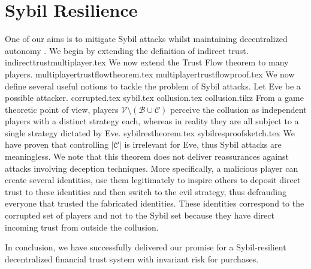 \section{Sybil Resilience}
  One of our aims is to mitigate Sybil attacks \cite{sybilattack} whilst maintaining decentralized autonomy \cite{dionyziz}.
  We begin by extending the definition of indirect trust.
  {indirecttrustmultiplayer.tex}
  \noindent We now extend the Trust Flow theorem to many players.
  {multiplayertrustflowtheorem.tex}
  {multiplayertrustflowproof.tex}
  \noindent We now define several useful notions to tackle the problem of Sybil attacks. Let Eve be a possible attacker.
  {corrupted.tex}
  {sybil.tex}
  {collusion.tex}
  {collusion.tikz}
  From a game theoretic point of view, players $\mathcal{V} \setminus (\mathcal{B} \cup \mathcal{C})$ perceive the collusion
  as independent players with a distinct strategy each, whereas in reality they are all subject to a single strategy dictated
  by Eve.
  {sybilrestheorem.tex}
  {sybilresproofsketch.tex}
  We have proven that controlling $|\mathcal{C}|$ is irrelevant for Eve, thus Sybil attacks are meaningless. We note that
  this theorem does not deliver reassurances against attacks involving deception techniques. More specifically, a malicious
  player can create several identities, use them legitimately to inspire others to deposit direct trust to these identities
  and then switch to the evil strategy, thus defrauding everyone that trusted the fabricated identities. These identities
  correspond to the corrupted set of players and not to the Sybil set because they have direct incoming trust from outside
  the collusion.

  In conclusion, we have successfully delivered our promise for a Sybil-resilient decentralized financial trust system with
  invariant risk for purchases.

